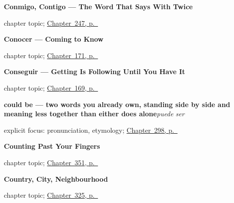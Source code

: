 \noindent\begin{minipage}[t]{\linewidth}
\raggedright
\textbf{Conmigo, Contigo --- The Word That Says With Twice}\par
\footnotesize chapter topic; \hyperref[ch:conmigo]{Chapter~247, p.~\pageref*{ch:conmigo}}
\end{minipage}\par\smallskip

\noindent\begin{minipage}[t]{\linewidth}
\raggedright
\textbf{Conocer --- Coming to Know}\par
\footnotesize chapter topic; \hyperref[ch:spanish-conocer]{Chapter~171, p.~\pageref*{ch:spanish-conocer}}
\end{minipage}\par\smallskip

\noindent\begin{minipage}[t]{\linewidth}
\raggedright
\textbf{Conseguir --- Getting Is Following Until You Have It}\par
\footnotesize chapter topic; \hyperref[ch:spanish-conseguir]{Chapter~169, p.~\pageref*{ch:spanish-conseguir}}
\end{minipage}\par\smallskip

\noindent\begin{minipage}[t]{\linewidth}
\raggedright
\textbf{could be — two words you already own, standing side by side and meaning less together than either does alone}\enspace\emph{puede ser}\par
\footnotesize explicit focus: pronunciation, etymology; \hyperref[ch:mas-respuestas]{Chapter~298, p.~\pageref*{ch:mas-respuestas}}
\end{minipage}\par\smallskip

\noindent\begin{minipage}[t]{\linewidth}
\raggedright
\textbf{Counting Past Your Fingers}\par
\footnotesize chapter topic; \hyperref[ch:cien-y-la-cantidad]{Chapter~351, p.~\pageref*{ch:cien-y-la-cantidad}}
\end{minipage}\par\smallskip

\noindent\begin{minipage}[t]{\linewidth}
\raggedright
\textbf{Country, City, Neighbourhood}\par
\footnotesize chapter topic; \hyperref[ch:pais-y-lugar]{Chapter~325, p.~\pageref*{ch:pais-y-lugar}}
\end{minipage}\par\smallskip

